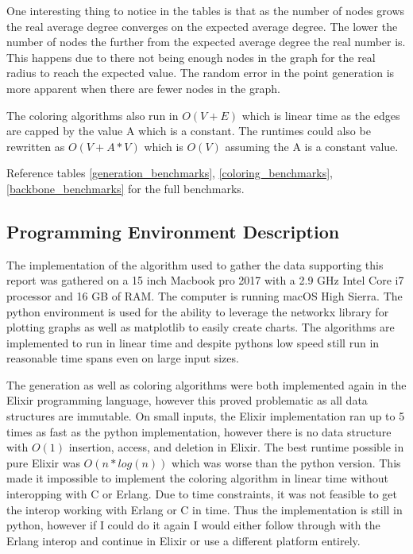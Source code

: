 \documentclass{article}
\begin{document}
	One interesting thing to notice in the tables is that as the number of nodes grows the real average degree converges on the expected average degree.
	The lower the number of nodes the further from the expected average degree the real number is.
	This happens due to there not being enough nodes in the graph for the real radius to reach the expected value.
  The random error in the point generation is more apparent when there are fewer nodes in the graph.

  The coloring algorithms also run in $O(V+E)$ which is linear time as the edges are capped by the value A which is a constant.
  The runtimes could also be rewritten as $O(V + A*V)$ which is $O(V)$ assuming the A is a constant value.

  Reference tables \ref{generation_benchmarks}, \ref{coloring_benchmarks}, \ref{backbone_benchmarks} for the full benchmarks.

  \subsection{Programming Environment Description}
		The implementation of the algorithm used to gather the data supporting this report was gathered on a 15 inch Macbook pro 2017 with a 2.9 GHz Intel Core i7 processor and 16 GB of RAM.
		The computer is running macOS High Sierra.
    The python environment is used for the ability to leverage the networkx library for plotting graphs as well as matplotlib to easily create charts.
    The algorithms are implemented to run in linear time and despite pythons low speed still run in reasonable time spans even on large input sizes.

    The generation as well as coloring algorithms were both implemented again in the Elixir programming language, however this proved problematic as all data structures are immutable.
    On small inputs, the Elixir implementation ran up to 5 times as fast as the python implementation, however there is no data structure with $O(1)$ insertion, access, and deletion in Elixir.
    The best runtime possible in pure Elixir was $O(n*log(n))$ which was worse than the python version.
    This made it impossible to implement the coloring algorithm in linear time without interopping with C or Erlang.
    Due to time constraints, it was not feasible to get the interop working with Erlang or C in time.
    Thus the implementation is still in python, however if I could do it again I would either follow through with the Erlang interop and continue in Elixir or use a different platform entirely.
\end{document}
